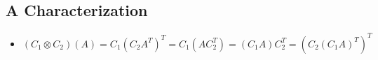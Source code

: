 \subsection{A Characterization}

\begin{itemize}
    \item
    \[
        (C_1\otimes C_2)(A)=C_1(C_2A^T)^T=C_1(AC_2^T)=(C_1A)C_2^T=(C_2(C_1A)^T)^T
    \]
\end{itemize}